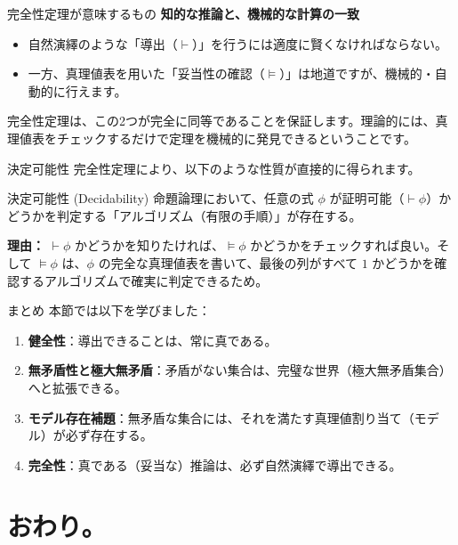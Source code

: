 \documentclass[unicode,10pt]{beamer}
\begin{document}
\begin{frame}{完全性定理が意味するもの}
    \textbf{知的な推論と、機械的な計算の一致}
    
    \begin{itemize}
        \item 自然演繹のような「導出（$\vdash$）」を行うには適度に賢くなければならない。
        \item 一方、真理値表を用いた「妥当性の確認（$\models$）」は地道ですが、機械的・自動的に行えます。
    \end{itemize}
    \vspace{1em}
    完全性定理は、この2つが完全に同等であることを保証します。理論的には、真理値表をチェックするだけで定理を機械的に発見できるということです。
\end{frame}

\begin{frame}{決定可能性}
    完全性定理により、以下のような性質が直接的に得られます。

    \begin{block}{決定可能性 (Decidability)}
        命題論理において、任意の式 $\phi$ が証明可能（$\vdash \phi$）かどうかを判定する「アルゴリズム（有限の手順）」が存在する。
    \end{block}
    
    \textbf{理由：}
    $\vdash \phi$ かどうかを知りたければ、$\models \phi$ かどうかをチェックすれば良い。そして $\models \phi$ は、$\phi$ の完全な真理値表を書いて、最後の列がすべて $1$ かどうかを確認するアルゴリズムで確実に判定できるため。
\end{frame}

\begin{frame}{まとめ}
    本節では以下を学びました：
    
    \begin{enumerate}
        \item \textbf{健全性}：導出できることは、常に真である。
        \item \textbf{無矛盾性と極大無矛盾}：矛盾がない集合は、完璧な世界（極大無矛盾集合）へと拡張できる。
        \item \textbf{モデル存在補題}：無矛盾な集合には、それを満たす真理値割り当て（モデル）が必ず存在する。
        \item \textbf{完全性}：真である（妥当な）推論は、必ず自然演繹で導出できる。
    \end{enumerate}
\end{frame}

\section{おわり。}
\end{document}
